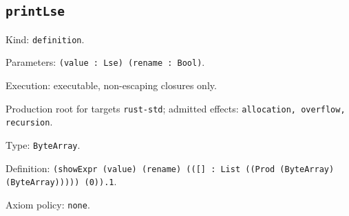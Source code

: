 \documentclass[11pt]{article}
\begin{document}
\subsection*{\texttt{printLse}}
\noindent Kind: \texttt{definition}.\par
\noindent Parameters: \texttt{(value : Lse) (rename : Bool)}.\par
\noindent Execution: executable, non-escaping closures only.\par
\noindent Production root for targets \texttt{rust-std}; admitted effects: \texttt{allocation, overflow, recursion}.\par
\noindent Type: \texttt{ByteArray}.\par
\noindent Definition: \texttt{(showExpr (value) (rename) (([] : List ((Prod (ByteArray) (ByteArray))))) (0)).1}.\par
\noindent Axiom policy: \texttt{none}.\par
\end{document}
